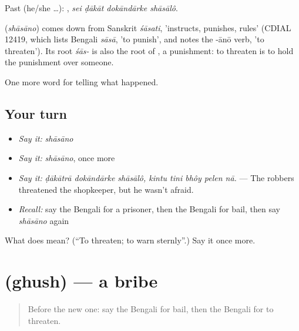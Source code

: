 Past (he/she …):    , \emph{sei ḍākāt dokāndārke shāsālô}.

\begin{cousinweb}
\textbf{} (\emph{shāsāno}) comes down from Sanskrit \emph{śāsati}, 'instructs, punishes, rules' (CDIAL 12419, which lists Bengali \emph{sāsā}, 'to punish', and notes the -ānō verb, 'to threaten'). Its root \emph{śās-} is also the root of \textbf{}, a punishment: to threaten is to hold the punishment over someone.
\end{cousinweb}

\begin{grammarlens}[title={What you've built}]
One more word for telling what happened.
\end{grammarlens}

\subsection*{Your turn}
\begin{itemize}
\raggedright
  \item \emph{Say it:} \emph{shāsāno}
  \item \emph{Say it:} \emph{shāsāno}, once more
  \item \emph{Say it:} \emph{ḍākātrā dokāndārke shāsālô, kintu tini bhôy pelen nā.} — The robbers threatened the shopkeeper, but he wasn't afraid.
  \item \emph{Recall:} say the Bengali for a prisoner, then the Bengali for bail, then say \emph{shāsāno} again
\end{itemize}

\begin{tcolorbox}[breakable,colback=teal!4,colframe=teal!35!black,title={Before you move on}]
What does  mean? (\textquotedblleft{}To threaten; to warn sternly\textquotedblright{}.) Say it once more.
\end{tcolorbox}
\section[\texorpdfstring{\bn{ঘুষ} (ghush)}{ঘুষ (ghush)}]{ (ghush) — a bribe}

\label{lesson:BN-C285-ghush}



\begin{quote}
Before the new one: say the Bengali for bail, then the Bengali for to threaten.
\end{quote}

